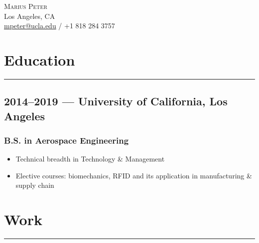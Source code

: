 \documentclass[10pt]{article}
\begin{document}
\renewcommand\labelitemi{-}
\begin{center}
    \huge \textsc{Marius Peter}\\[0.2cm]

    \normalsize
    Los Angeles, CA\\
    \href{mailto:mpeter@ucla.edu}{mpeter@ucla.edu} / +1 818 284 3757\\
\end{center}




\section*{Education}
\rule{\linewidth}{1pt}
\subsection*{2014--2019 --- University of California, Los Angeles}
\subsubsection*{B.S. in Aerospace Engineering}
\begin{itemize}
    \item Technical breadth in Technology \& Management
    \item Elective courses: biomechanics, RFID and its application in manufacturing \& supply chain
\end{itemize}

\section*{Work}
\rule{\linewidth}{1pt}
\end{document}
